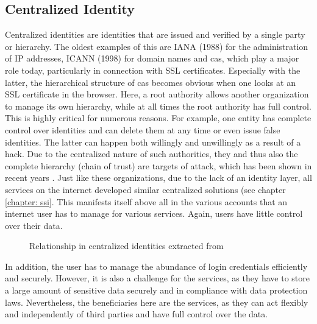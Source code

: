 	    \subsection{Centralized Identity}
	    Centralized identities are identities that are issued and verified by a single party or hierarchy. The oldest examples of this are IANA (1988) for the administration of IP addresses, ICANN (1998) for domain names and \acfp{ca}, which play a major role today, particularly in connection with SSL certificates. Especially with the latter, the hierarchical structure of \acp{ca} becomes obvious when one looks at an SSL certificate in the browser. Here, a root authority allows another organization to manage its own hierarchy, while at all times the root authority has full control. This is highly critical for numerous reasons. For example, one entity has complete control over identities and can delete them at any time or even issue false identities. The latter can happen both willingly and unwillingly as a result of a hack. Due to the centralized nature of such authorities, they and thus also the complete hierarchy (chain of trust) are targets of attack, which has been shown in recent years \cite{borchers_diginotar-ssl-gau_2012}. Just like these organizations, due to the lack of an identity layer, all services on the internet developed similar centralized solutions (see chapter \ref{chapter: ssi}. This manifests itself above all in the various accounts that an internet user has to manage for various services. Again, users have little control over their data. \cite{allen_path_2016}
	    
	    \begin{figure}[ht]
    	    \centering
    	    \makebox[\textwidth]{}
            \caption{Relationship in centralized identities extracted from \cite[p. 7]{preukschat_self-sovereign_2021}}
            \label{figure: centralized}
        \end{figure}
	    
	    In addition, the user has to manage the abundance of login credentials efficiently and securely. However, it is also a challenge for the services, as they have to store a large amount of sensitive data securely and in compliance with data protection laws. Nevertheless, the beneficiaries here are the services, as they can act flexibly and independently of third parties and have full control over the data. \cite[p. 6]{ehrlich_self-sovereign_2021}
	    
